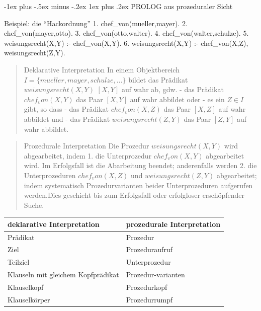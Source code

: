 \documentclass[a4paper]{article}
\makeatletter
\renewcommand{\subsubsection}{\@startsection{subsubsection}{3}{0mm}%
                {-1ex plus -.5ex minus -.2ex}%
                {1ex plus .2ex}%
                {\normalfont\small\bfseries}}
\makeatother
\begin{document}
\begin{multicols}{3}
  \subsubsection{PROLOG aus prozeduraler
    Sicht}\label{prolog-aus-prozeduraler-sicht}

  Beispiel: die ``Hackordnung'' 1. chef\_von(mueller,mayer). 2.
  chef\_von(mayer,otto). 3. chef\_von(otto,walter). 4.
  chef\_von(walter,schulze). 5. weisungsrecht(X,Y) :- chef\_von(X,Y). 6.
  weisungsrecht(X,Y) :- chef\_von(X,Z), weisungsrecht(Z,Y).

  \begin{quote}
    Deklarative Interpretation In einem Objektbereich
    $I=\{mueller, mayer, schulze, ...\}$ bildet das Prädikat
    $weisungsrecht(X,Y)$ $[X,Y]$ auf wahr ab, gdw. - das Prädikat
    $chef_von(X,Y)$ das Paar $[X,Y]$ auf wahr abbildet oder - es ein
    $Z\in I$ gibt, so dass - das Prädikat $chef_von(X,Z)$ das Paar $[X,Z]$
    auf wahr abbildet und - das Prädikat $weisungsrecht(Z,Y)$ das Paar
    $[Z,Y]$ auf wahr abbildet.
  \end{quote}

  \begin{quote}
    Prozedurale Interpretation Die Prozedur $weisungsrecht(X,Y)$ wird
    abgearbeitet, indem 1. die Unterprozedur $chef_von(X,Y)$ abgearbeitet
    wird. Im Erfolgsfall ist die Abarbeitung beendet; anderenfalls werden 2.
    die Unterprozeduren $chef_von(X,Z)$ und $weisungsrecht(Z,Y)$
    abgearbeitet; indem systematisch Prozedurvarianten beider
    Unterprozeduren aufgerufen werden.Dies geschieht bis zum Erfolgsfall
    oder erfolgloser erschöpfender Suche.
  \end{quote}

  \begin{tabular}{ll}
    deklarative Interpretation         & prozedurale Interpretation \\\hline
    Prädikat                           & Prozedur                   \\
    Ziel                               & Prozeduraufruf             \\
    Teilziel                           & Unterprozedur              \\
    Klauseln mit gleichem Kopfprädikat & Prozedur-varianten         \\
    Klauselkopf                        & Prozedurkopf               \\
    Klauselkörper                      & Prozedurrumpf              \\
  \end{tabular}


\end{multicols}
\end{document}
